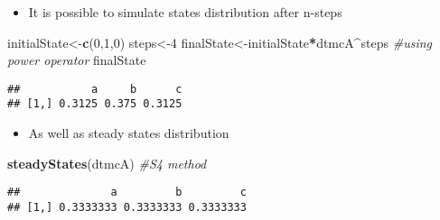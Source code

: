 \documentclass[ignorenonframetext,]{beamer}
\newenvironment{Shaded}{\begin{snugshade}}{\end{snugshade}}
\newcommand{\CommentTok}[1]{\textcolor[rgb]{0.56,0.35,0.01}{\textit{#1}}}
\newcommand{\DecValTok}[1]{\textcolor[rgb]{0.00,0.00,0.81}{#1}}
\newcommand{\KeywordTok}[1]{\textcolor[rgb]{0.13,0.29,0.53}{\textbf{#1}}}
\newcommand{\NormalTok}[1]{#1}
\newcommand{\OperatorTok}[1]{\textcolor[rgb]{0.81,0.36,0.00}{\textbf{#1}}}
\providecommand{\tightlist}{%
  \setlength{\itemsep}{0pt}\setlength{\parskip}{0pt}}
\providecommand{\tightlist}{
  \setlength{\itemsep}{0pt}\setlength{\parskip}{0pt}
}
\begin{document}
\begin{frame}[fragile]

\begin{itemize}
\tightlist
\item
  It is possible to simulate states distribution after n-steps
\end{itemize}

\begin{Shaded}
\begin{Highlighting}[]
\NormalTok{initialState<-}\KeywordTok{c}\NormalTok{(}\DecValTok{0}\NormalTok{,}\DecValTok{1}\NormalTok{,}\DecValTok{0}\NormalTok{)}
\NormalTok{steps<-}\DecValTok{4}
\NormalTok{finalState<-initialState}\OperatorTok{*}\NormalTok{dtmcA}\OperatorTok{^}\NormalTok{steps }\CommentTok{#using power operator}
\NormalTok{finalState}
\end{Highlighting}
\end{Shaded}

\begin{verbatim}
##           a     b      c
## [1,] 0.3125 0.375 0.3125
\end{verbatim}

\end{frame}

\begin{frame}[fragile]

\begin{itemize}
\tightlist
\item
  As well as steady states distribution
\end{itemize}

\begin{Shaded}
\begin{Highlighting}[]
\KeywordTok{steadyStates}\NormalTok{(dtmcA) }\CommentTok{#S4 method}
\end{Highlighting}
\end{Shaded}

\begin{verbatim}
##              a         b         c
## [1,] 0.3333333 0.3333333 0.3333333
\end{verbatim}

\end{frame}
\end{document}
